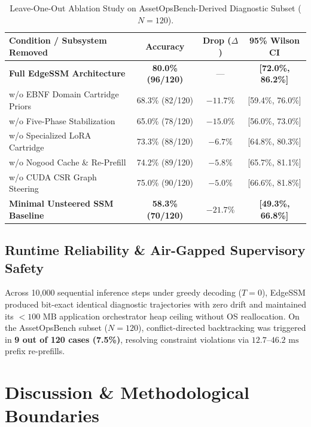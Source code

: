 \documentclass[journal]{IEEEtran}
\begin{document}
\begin{table}[htbp]
\centering
\caption{Leave-One-Out Ablation Study on AssetOpsBench-Derived Diagnostic Subset ($N=120$).}
\label{tab:ablation}
\footnotesize
\begin{tabular}{@{}lccc@{}}
\toprule
\textbf{Condition / Subsystem Removed} & \textbf{Accuracy} & \textbf{Drop ($\Delta$)} & \textbf{95\% Wilson CI} \\
\midrule
\textbf{Full EdgeSSM Architecture} & \textbf{80.0\% (96/120)} & --- & \textbf{[72.0\%, 86.2\%]} \\
w/o EBNF Domain Cartridge Priors & 68.3\% (82/120) & $-11.7\%$ & [59.4\%, 76.0\%] \\
w/o Five-Phase Stabilization & 65.0\% (78/120) & $-15.0\%$ & [56.0\%, 73.0\%] \\
w/o Specialized LoRA Cartridge & 73.3\% (88/120) & $-6.7\%$ & [64.8\%, 80.3\%] \\
w/o Nogood Cache \& Re-Prefill & 74.2\% (89/120) & $-5.8\%$ & [65.7\%, 81.1\%] \\
w/o CUDA CSR Graph Steering & 75.0\% (90/120) & $-5.0\%$ & [66.6\%, 81.8\%] \\
\textbf{Minimal Unsteered SSM Baseline} & \textbf{58.3\% (70/120)} & \textbf{$-21.7\%$} & \textbf{[49.3\%, 66.8\%]} \\
\bottomrule
\end{tabular}
\end{table}

\subsection{Runtime Reliability \& Air-Gapped Supervisory Safety}
Across 10,000 sequential inference steps under greedy decoding ($T=0$), EdgeSSM produced bit-exact identical diagnostic trajectories with zero drift and maintained its $<100\text{ MB}$ application orchestrator heap ceiling without OS reallocation. On the AssetOpsBench subset ($N=120$), conflict-directed backtracking was triggered in \textbf{9 out of 120 cases (7.5\%)}, resolving constraint violations via $12.7\text{--}46.2\text{ ms}$ prefix re-prefills.

\section{Discussion \& Methodological Boundaries}
\end{document}
